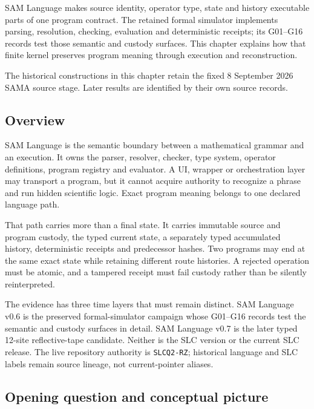 \label{viii-ch02-sam-language-and-exact-program-semantics}

SAM Language makes source identity, operator type, state and history executable parts of one program contract. The retained formal simulator implements parsing, resolution, checking, evaluation and deterministic receipts; its G01--G16 records test those semantic and custody surfaces. This chapter explains how that finite kernel preserves program meaning through execution and reconstruction.

The historical constructions in this chapter retain the fixed 8 September 2026 SAMA source stage. Later results are identified by their own source records.

\subsection{Overview}\label{viii-ch02-overview}

SAM Language is the semantic boundary between a mathematical grammar and
an execution. It owns the parser, resolver, checker, type system,
operator definitions, program registry and evaluator. A UI, wrapper or
orchestration layer may transport a program, but it cannot acquire
authority to recognize a phrase and run hidden scientific logic. Exact
program meaning belongs to one declared language path.

That path carries more than a final state. It carries immutable source
and program custody, the typed current state, a separately typed
accumulated history, deterministic receipts and predecessor hashes. Two
programs may end at the same exact state while retaining different route
histories. A rejected operation must be atomic, and a tampered receipt
must fail custody rather than be silently reinterpreted.

The evidence has three time layers that must remain distinct. SAM
Language v0.6 is the preserved formal-simulator campaign whose G01--G16
records test the semantic and custody surfaces in detail. SAM Language
v0.7 is the later typed 12-site reflective-tape candidate. Neither is
the SLC version or the current SLC release. The live repository
authority is \texttt{SLCQ2-RZ}; historical language and SLC labels
remain source lineage, not current-pointer aliases.

\subsection{Opening question and conceptual
picture}\label{viii-ch02-opening-question-and-conceptual-picture}

